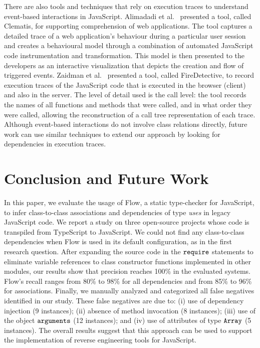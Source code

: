\documentclass[review]{elsarticle}
\newcommand{\mcode}[1]{$\tt #1$}
\begin{document}
There are also tools and techniques that rely on execution traces to understand event-based interactions in JavaScript. Alimadadi et al.~\cite{clematis2014} presented a tool, called Clematis, for supporting comprehension of web applications. The tool captures a detailed trace of a web application's behaviour during a particular user session and creates a behavioural model through a combination of automated JavaScript code instrumentation and transformation. This model is then presented to the developers as an interactive visualization that depicts the creation and flow of triggered events. Zaidman et al.~\cite{zaidman-2013} presented a tool, called FireDetective, to record execution traces of the JavaScript code that is executed in the browser (client) and also in the server. The level of detail used is the call level: the tool records the names of all functions and methods that were called, and in what order they were called, allowing the reconstruction of a call tree representation of each trace. Although event-based interactions do not involve class relations directly, future work can use similar techniques to extend our approach by looking for dependencies in execution traces. 


\section{Conclusion and Future Work}
\label{sec:conclusion}

In this paper, we evaluate the usage of Flow, a static type-checker for JavaScript, to infer class-to-class associations and dependencies of type \textit{uses} in legacy JavaScript code. We report a study on three open-source projects whose code is transpiled from TypeScript to JavaScript. We could not find any class-to-class dependencies when Flow is used in its default configuration, as in the first research question. After expanding the source code in the \mcode{require} statements to eliminate variable references to class constructor functions implemented in other modules, our results show that precision reaches 100\% in the evaluated systems. Flow's recall ranges from 80\% to 98\% for all dependencies and from 85\% to 96\% for associations. Finally, we manually analyzed and categorized all false negatives identified in our study. These false negatives are due to: (i) use of dependency injection (9 instances); (ii) absence of method invocation (8 instances); (iii) use of the object \mcode{arguments} (12 instances); and (iv) use of attributes of type \mcode{Array} (5 instances). The overall results suggest that this approach can be used to support the implementation of reverse engineering tools for JavaScript. 
\end{document}

